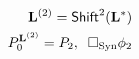 \documentclass[preview]{standalone}
\begin{document}
\begin{align*}
\special{dvisvgm:raw <g id='unique000'>}\mathbf{L}^{(2)} = \mathsf{Shift}^2(\mathbf{L}^*)\\P_0^{\mathbf{L}^{(2)}} = P_2,\;\; \Box_{\text{Syn}}\phi_2\special{dvisvgm:raw </g>}
\end{align*}
\end{document}
